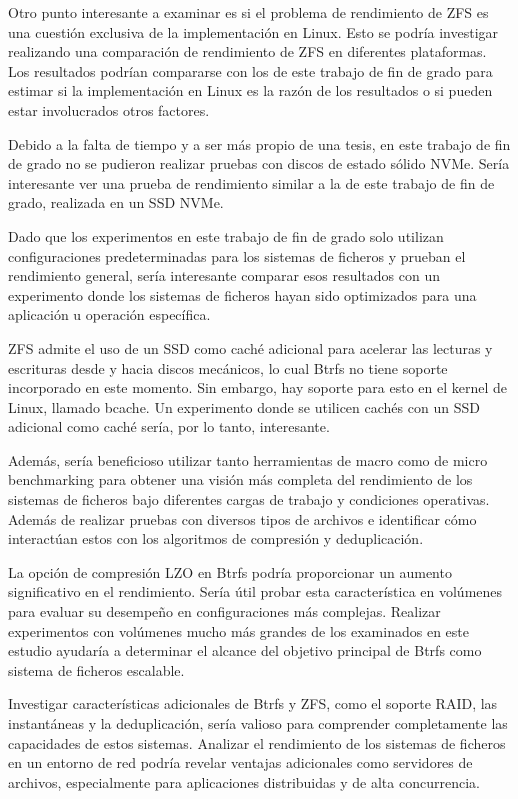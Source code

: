 Otro punto interesante a examinar es si el problema de rendimiento de ZFS es una cuestión exclusiva de la implementación en Linux. Esto se podría investigar realizando una comparación de rendimiento de ZFS en diferentes plataformas. Los resultados podrían compararse con los de este trabajo de fin de grado para estimar si la implementación en Linux es la razón de los resultados o si pueden estar involucrados otros factores.

Debido a la falta de tiempo y a ser más propio de una tesis, en este trabajo de fin de grado no se pudieron realizar pruebas con discos de estado sólido NVMe. Sería interesante ver una prueba de rendimiento similar a la de este trabajo de fin de grado, realizada en un SSD NVMe.

Dado que los experimentos en este trabajo de fin de grado solo utilizan configuraciones predeterminadas para los sistemas de ficheros y prueban el rendimiento general, sería interesante comparar esos resultados con un experimento donde los sistemas de ficheros hayan sido optimizados para una aplicación u operación específica.

ZFS admite el uso de un SSD como caché adicional para acelerar las lecturas y escrituras desde y hacia discos mecánicos, lo cual Btrfs no tiene soporte incorporado en este momento. Sin embargo, hay soporte para esto en el kernel de Linux, llamado bcache. Un experimento donde se utilicen cachés con un SSD adicional como caché sería, por lo tanto, interesante.

Además, sería beneficioso utilizar tanto herramientas de macro como de micro benchmarking para obtener una visión más completa del rendimiento de los sistemas de ficheros bajo diferentes cargas de trabajo y condiciones operativas. Además de realizar pruebas con diversos tipos de archivos e identificar cómo interactúan estos con los algoritmos de compresión y deduplicación.

La opción de compresión LZO en Btrfs podría proporcionar un aumento significativo en el rendimiento. Sería útil probar esta característica en volúmenes para evaluar su desempeño en configuraciones más complejas. Realizar experimentos con volúmenes mucho más grandes de los examinados en este estudio ayudaría a determinar el alcance del objetivo principal de Btrfs como sistema de ficheros escalable.

Investigar características adicionales de Btrfs y ZFS, como el soporte RAID, las instantáneas y la deduplicación, sería valioso para comprender completamente las capacidades de estos sistemas. Analizar el rendimiento de los sistemas de ficheros en un entorno de red podría revelar ventajas adicionales como servidores de archivos, especialmente para aplicaciones distribuidas y de alta concurrencia.

